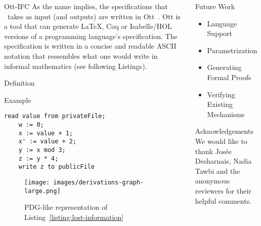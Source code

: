 \documentclass[final]{beamer}
\newlength{\onecolwid}
\begin{document}
\begin{frame}[fragile]
\begin{columns}[t]
\begin{column}{\onecolwid}
\begin{block}{Ott-IFC}
    As the name implies, the specifications that \ottifc\ takes as input (and outputs) are written in Ott~\cite{DBLP:journals/jfp/SewellNOPRSS10}. Ott is a tool that can generate LaTeX, Coq or Isabelle/HOL versions of a programming language's specification. The specification is written in a concise and readable ASCII notation that ressembles what one would write in informal mathematics (see following Listings).
\end{block}

\begin{alertblock}{Definition}

\end{alertblock}

\begin{alertblock}{Example}
    \begin{lstlisting}[captionpos=b,caption=~,label=listing:lost-information]
    read value from privateFile;
    w := 0;
    x := value + 1;
    x' := value + 2;
    y := x mod 3;
    z := y * 4;
    write z to publicFile
    \end{lstlisting}

    \begin{figure}[ht]
    \texttt{[image: images/derivations-graph-large.png]}
    \caption{PDG-like representation of Listing~\ref{listing:lost-information}}
    \label{figure:derivations}
    \end{figure}
\end{alertblock}

\end{column}

\begin{column}{\onecolwid}

\begin{block}{Future Work}
    \begin{itemize}
        \item Language Support
        \item Parametrization
        \item Generating Formal Proofs
        \item Verifying Existing Mechanisms
    \end{itemize}
\end{block}

    \begin{block}{Acknowledgements}
        We would like to thank Josée Desharnais, Nadia Tawbi and the anonymous reviewers for their helpful comments.
    \end{block}
\end{column}
\end{columns}
\end{frame}
\end{document}
